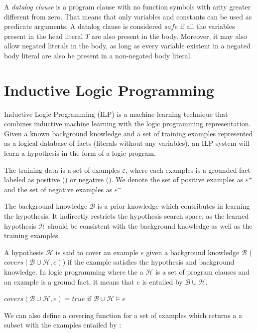 A \emph{datalog clause} is a program clause with no function symbols with arity greater different from zero. That means
that only variables and constants can be used as predicate arguments. A datalog clause is considered $safe$ if all the
variables present in the head literal $T$ are also present in the body. Moreover, it may also allow negated literals in
the body, as long as every variable existent in a negated body literal are also be present in a non-negated body
literal.

\section{Inductive Logic Programming}

\cite{DBLP:journals/ml/LavracD96}
Inductive Logic Programming (ILP) is a machine learning technique that combines inductive machine learning with the
logic programming representation. Given a known background knowledge and a set of training examples represented as a
logical database of facts (literals without any variables), an ILP system will learn a hypothesis in the form of a
logic program.

The training data is a set of examples $\varepsilon$, where each examples is a grounded fact labeled as positive
(\oplus) or negative (\ominus). We denote the set of positive examples as $\varepsilon^{+}$ and the set of negative
examples as $\varepsilon^{-}$

The background knowledge $\mathcal{B}$ is a prior knowledge which contributes in learning the hypothesis. It indirectly
restricts the hypothesis search space, as  the learned hypothesis $\mathcal{H}$ should be consistent with the background
knowledge as well as the training examples.

A hypothesis $\mathcal{H}$ is said to cover an example $e$ given a background knowledge $\mathcal{B}$
($covers(\mathcal{B} \cup \mathcal{H},e)$) if the example satisfies the hypothesis and background knowledge. In logic
programming where the a $\mathcal{H}$ is a set of program clauses and an example is a ground fact, it means that $e$ is
entailed by $\mathcal{B} \cup \mathcal{H}$.

\begin{center}
 $covers(\mathcal{B} \cup \mathcal{H},e)=true$ if $\mathcal{B} \cup \mathcal{H} \models e$
\end{center}

We can also define a covering function for a set of examples which returns a a subset with the examples entailed by
 \cup {}:

